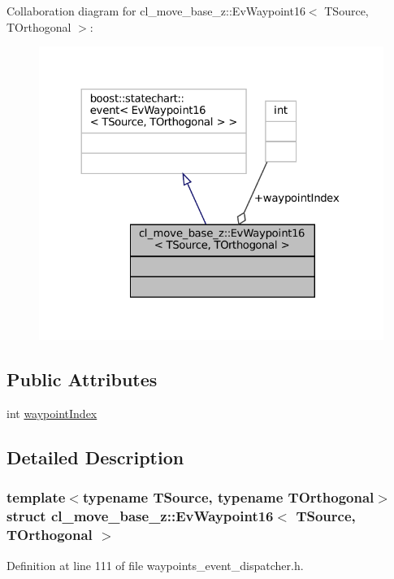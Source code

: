 Collaboration diagram for cl\+\_\+move\+\_\+base\+\_\+z\+:\+:Ev\+Waypoint16$<$ T\+Source, T\+Orthogonal $>$\+:
\nopagebreak
\begin{figure}[H]
\begin{center}
\leavevmode
\includegraphics[width=324pt]{structcl__move__base__z_1_1EvWaypoint16__coll__graph}
\end{center}
\end{figure}
\subsection*{Public Attributes}
\begin{DoxyCompactItemize}
\item 
int \hyperlink{structcl__move__base__z_1_1EvWaypoint16_ab6d126c7c04f63d61a12a4fb160637f1}{waypoint\+Index}
\end{DoxyCompactItemize}


\subsection{Detailed Description}
\subsubsection*{template$<$typename T\+Source, typename T\+Orthogonal$>$\newline
struct cl\+\_\+move\+\_\+base\+\_\+z\+::\+Ev\+Waypoint16$<$ T\+Source, T\+Orthogonal $>$}



Definition at line 111 of file waypoints\+\_\+event\+\_\+dispatcher.\+h.



